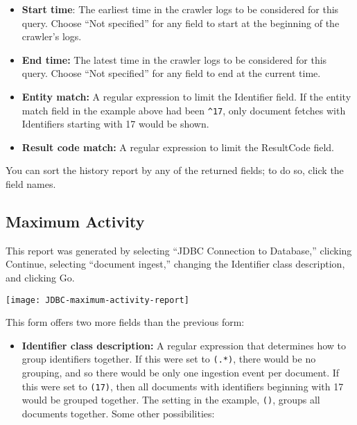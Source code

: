 \begin{changemargin}{1.5in}{0in}
\begin{itemize}
\item \textbf{Start time}: The earliest time in the crawler logs to be
considered for this query.  Choose ``Not specified'' for any field to
start at the beginning of the crawler's logs.

\item \textbf{End time:} The latest time in the crawler logs to be
considered for this query. Choose ``Not specified'' for any field 
to end at the current time.

\item \textbf{Entity match:} A regular expression to limit the
Identifier field. If the entity match field in the example above had
been \texttt{\^{}17}, only document fetches with Identifiers starting
with 17 would be shown.

\item \textbf{Result code match:} A regular expression to limit the
ResultCode field.

\end{itemize}

You can sort the history report by any of the returned fields; to do so,
click the field names.


\subsection{Maximum Activity}

This report was generated by selecting ``JDBC Connection to Database,''
clicking Continue, selecting ``document ingest,'' changing the Identifier
class description, and clicking Go.

\texttt{[image: JDBC-maximum-activity-report]}

This form offers two more fields than the previous form:

\begin{itemize}

\item \textbf{Identifier class description:} A regular expression
that determines how to group identifiers together. If this were set to
\texttt{(.*)}, there would be no grouping, and so there would be only one
ingestion event per document. If this were set to \texttt{(17)},
then all documents with identifiers beginning with 17 would be grouped
together. The setting in the example, \texttt{()}, groups all
documents together. Some other possibilities:


\end{itemize}
\end{changemargin}
